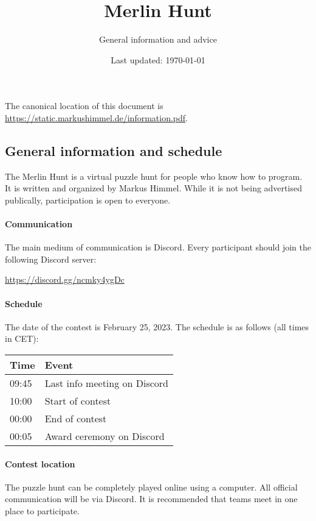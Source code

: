 \documentclass[fontsize=10pt,a4paper,DIV=12,parskip=half]{scrarticle}
\title{Merlin Hunt}
\subtitle{General information and advice}
\date{Last updated: \today}
\begin{document}
\maketitle

The canonical location of this document is \url{https://static.markushimmel.de/information.pdf}.

\subsection*{General information and schedule}

The Merlin Hunt is a virtual puzzle hunt for people who know how to program.
It is written and organized by Markus Himmel. While it is not being advertised
publically, participation is open to everyone.

\paragraph{Communication} The main medium of communication is Discord. Every participant should join the following
Discord server:

\begin{center}
	\url{https://discord.gg/ncmky4ygDc}
\end{center}

\paragraph{Schedule}
The date of the contest is February 25, 2023. The schedule is as follows (all times in CET):

\begin{center}
	\begin{tabular}{@{}ll@{}}
		\toprule
		Time & Event \\ \midrule
		09:45 & Last info meeting on Discord \\
		10:00 & Start of contest \\
		00:00 & End of contest \\
		00:05 & Award ceremony on Discord \\ \bottomrule
	\end{tabular}
\end{center}

\paragraph{Contest location}
The puzzle hunt can be completely played online using a computer. All official
communication will be via Discord.
It is recommended that teams meet in one place to participate.
\end{document}
